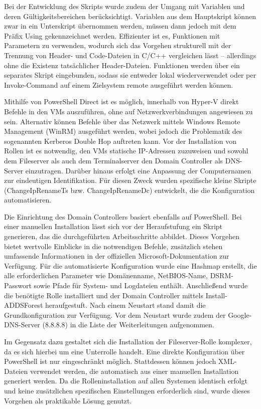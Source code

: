 \documentclass[conference]{IEEEtran}
\begin{document}
Bei der Entwicklung des Skripts wurde zudem der Umgang mit Variablen und deren Gültigkeitsbereichen berücksichtigt. Variablen aus dem Hauptskript können zwar in ein Unterskript übernommen werden, müssen dann jedoch mit dem Präfix Using gekennzeichnet werden. Effizienter ist es, Funktionen mit Parametern zu verwenden, wodurch sich das Vorgehen strukturell mit der Trennung von Header- und Code-Dateien in C/C++ vergleichen lässt – allerdings ohne die Existenz tatsächlicher Header-Dateien. Funktionen werden über ein separates Skript eingebunden, sodass sie entweder lokal wiederverwendet oder per Invoke-Command auf einem Zielsystem remote ausgeführt werden können.

Mithilfe von PowerShell Direct ist es möglich, innerhalb von Hyper-V direkt Befehle in den VMs auszuführen, ohne auf Netzwerkverbindungen angewiesen zu sein. Alternativ können Befehle über das Netzwerk mittels Windows Remote Management (WinRM) ausgeführt werden, wobei jedoch die Problematik des sogenannten Kerberos Double Hop auftreten kann. Vor der Installation von Rollen ist es notwendig, den VMs statische IP-Adressen zuzuweisen und sowohl dem Fileserver als auch dem Terminalserver den Domain Controller als DNS-Server einzutragen. Darüber hinaus erfolgt eine Anpassung der Computernamen zur eindeutigen Identifikation. Für diesen Zweck wurden spezifische kleine Skripte (ChangeIpRenameTs bzw. ChangeIpRenameDc) entwickelt, die die Konfiguration automatisieren.

Die Einrichtung des Domain Controllers basiert ebenfalls auf PowerShell. Bei einer manuellen Installation lässt sich vor der Heraufstufung ein Skript generieren, das die durchgeführten Arbeitsschritte abbildet. Dieses Vorgehen bietet wertvolle Einblicke in die notwendigen Befehle, zusätzlich stehen umfassende Informationen in der offiziellen Microsoft-Dokumentation zur Verfügung. Für die automatisierte Konfiguration wurde eine Hashmap erstellt, die alle erforderlichen Parameter wie Domänenname, NetBIOS-Name, DSRM-Passwort sowie Pfade für System- und Logdateien enthält. Anschließend wurde die benötigte Rolle installiert und der Domain Controller mittels Install-ADDSForest heraufgestuft. Nach einem Neustart stand damit die Grundkonfiguration zur Verfügung. Vor dem Neustart wurde zudem der Google-DNS-Server (8.8.8.8) in die Liste der Weiterleitungen aufgenommen.

Im Gegensatz dazu gestaltet sich die Installation der Fileserver-Rolle komplexer, da es sich hierbei um eine Unterrolle handelt. Eine direkte Konfiguration über PowerShell ist nur eingeschränkt möglich. Stattdessen können jedoch XML-Dateien verwendet werden, die automatisch aus einer manuellen Installation generiert werden. Da die Rolleninstallation auf allen Systemen identisch erfolgt und keine zusätzlichen spezifischen Einstellungen erforderlich sind, wurde dieses Vorgehen als praktikable Lösung genutzt.
\end{document}
